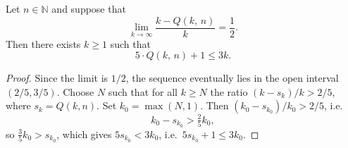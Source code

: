 \begin{lemma}\label{lemma:exists_ratio_bound_of_tendsto}\leanok
Let $n \in \mathbb{N}$ and suppose that
\[
  \lim_{k \to \infty} \frac{k - Q(k,\, n)}{k} = \frac{1}{2}.
\]
Then there exists $k \ge 1$ such that
\[
  5 \cdot Q(k,\, n) + 1 \le 3k.
\]
\end{lemma}
\begin{proof}\leanok
Since the limit is $1/2$, the sequence eventually lies in the open interval $(2/5, 3/5)$.
Choose $N$ such that for all $k \ge N$ the ratio $(k - s_k)/k > 2/5$, where $s_k = Q(k,n)$.
Set $k_0 = \max(N, 1)$. Then $(k_0 - s_{k_0})/k_0 > 2/5$, i.e.\
\[
  k_0 - s_{k_0} > \tfrac{2}{5} k_0,
\]
so $\tfrac{3}{5} k_0 > s_{k_0}$, which gives $5 s_{k_0} < 3 k_0$, i.e.\ $5 s_{k_0} + 1 \le 3 k_0$.
\end{proof}


